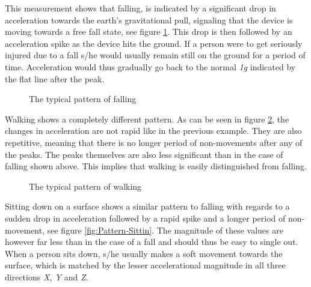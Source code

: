 \documentclass[12pt, a4paper, onecolumn]{article}
\begin{document}
	This measurement shows that falling, is indicated by a significant drop in acceleration towards the earth's gravitational pull, signaling that the device is moving towards a free fall state, see figure \ref{fig:Pattern-Falling}. This drop is then followed by an acceleration spike as the device hits the ground. If a person were to get seriously injured due to a fall s/he would usually remain still on the ground for a period of time. Acceleration would thus gradually go back to the normal \textit{1g} indicated by the flat line after the peak. 
	
	\begin{figure}[H]
		\centering
		\caption{The typical pattern of falling}%
		\label{fig:Pattern-Falling}%
	\end{figure}
	
	
	Walking shows a completely different pattern. As can be seen in figure \ref{fig:Pattern-Walking}, the changes in acceleration are not rapid like in the previous example. They are also repetitive, meaning that there is no longer period of non-movements after any of the peaks. The peaks themselves are also less significant than in the case of falling shown above. This implies that walking is easily distinguished from falling.
	
	\begin{figure}[H]
		\centering
		\caption{The typical pattern of walking}%
		\label{fig:Pattern-Walking}%
	\end{figure}
	
	
	 Sitting down on a surface shows a similar pattern to falling with regards to a sudden drop in acceleration followed by a rapid spike and a longer period of non-movement, see figure \ref{fig:Pattern-Sittin}. The magnitude of these values are however far less than in the case of a fall and should thus be easy to single out. When a person sits down, s/he usually makes a soft movement towards the surface, which is matched by the lesser accelerational magnitude in all three directions \textit{X, Y} and \textit{Z}.
	 
\end{document}
